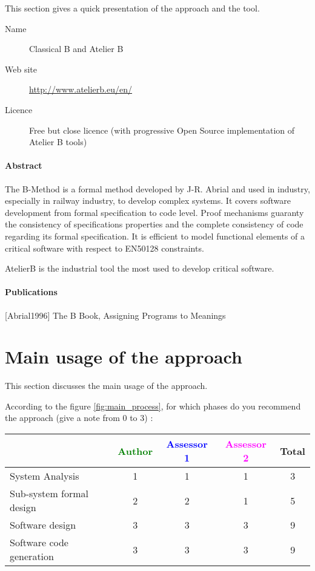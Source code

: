 This section gives a quick presentation of the approach and the tool.

\begin{description}
\item[Name] Classical B and Atelier B
\item[Web site] \url{http://www.atelierb.eu/en/}
\item[Licence] Free but close licence (with progressive Open Source implementation of Atelier B tools)
\end{description}

\paragraph{Abstract} 

The B-Method is a formal method developed by J-R. Abrial and used in industry, especially in railway industry, to develop complex systems. It covers software development from formal specification to code level. Proof mechanisms guaranty the consistency of specifications properties and the complete consistency of code regarding its formal specification. It is efficient to model  functional  elements of a critical software with respect to  EN50128 constraints.

AtelierB is the industrial  tool the most used to develop critical software.

\paragraph{Publications} 
[Abrial1996] The B Book, Assigning Programs to Meanings


\section{Main usage of the approach}
\label{main_usage}
This section discusses the main usage of the approach.

According to the figure \ref{fig:main_process}, for which phases do you recommend the approach (give a note from 0 to  3) :

\begin{tabular}{|l | c | c | c | c|}
\hline
& \textcolor{green}{Author} & \textcolor{blue}{Assessor 1} & \textcolor{magenta}{Assessor 2} & Total \\
\hline 
System Analysis & 1 & 1 & 1 & 3 \\
\hline
Sub-system formal design & 2 & 2 & 1 & 5\\
\hline
Software design & 3 & 3 & 3 & 9 \\
\hline
Software code generation & 3 & 3 & 3 & 9 \\
\hline
\end{tabular}

